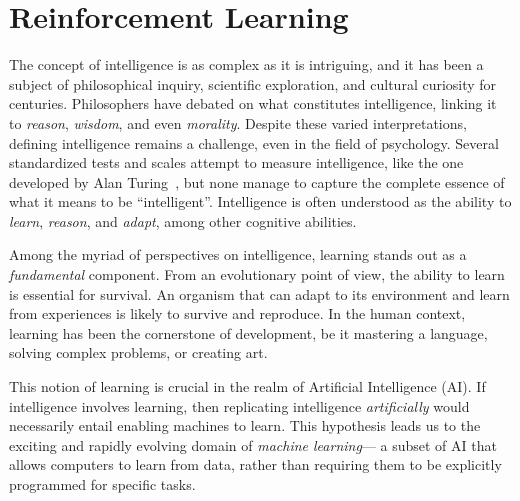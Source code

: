 \chapter{Reinforcement Learning}\label{chap:marl}\mtcaddchapter

\minitoc%
\newcommand{\RS}{\mathcal{S}}
\newcommand{\RA}{\mathcal{A}}
\newcommand{\RP}{\mathcal{P}}
\newcommand{\RR}{\mathcal{R}}
\newcommand{\RE}{\mathbb{E}}

The concept of intelligence is as complex as it is intriguing, 
 and it has been a subject of philosophical inquiry, 
 scientific exploration, and cultural curiosity for centuries. 
 Philosophers have debated on what constitutes intelligence, 
 linking it to \emph{reason}, \emph{wisdom}, and even \emph{morality}. 
%
Despite these varied interpretations, 
 defining intelligence remains a challenge, 
 even in the field of psychology. 
%
Several standardized tests and scales attempt to measure intelligence,
 like the one developed by Alan Turing~\cite{Turing1950-TURCMA}, 
 but none manage to capture the complete essence of what it means to be ``intelligent''. 
 Intelligence is often understood as the ability to \emph{learn}, \emph{reason}, and \emph{adapt}, among other cognitive abilities.

Among the myriad of perspectives on intelligence, 
 learning stands out as a \emph{fundamental} component. 
 From an evolutionary point of view, 
 the ability to learn is essential for survival. 
 An organism that can adapt to its environment and learn from experiences is likely to survive and reproduce. 
 In the human context, learning has been the cornerstone of development, 
 be it mastering a language, solving complex problems, or creating art.

This notion of learning is crucial in the realm of Artificial Intelligence (AI). 
%
 If intelligence involves learning, 
 then replicating intelligence \emph{artificially} would necessarily entail enabling machines to learn. 
 This hypothesis leads us to the exciting and rapidly evolving domain of \emph{machine learning}---
 a subset of AI that allows computers to learn from data, 
 rather than requiring them to be explicitly programmed for specific tasks.

